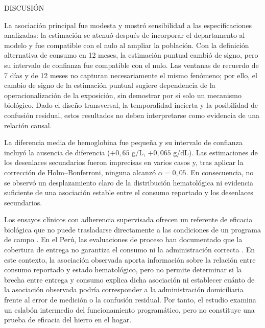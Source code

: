 \documentclass[man,11pt,donotrepeattitle,floatsintext]{apa7}
\makeatletter
\renewcommand{\section}{\@startsection {section}{1}{\z@}%
    {\b@level@one@skip}{\e@level@one@skip}%
    {\normalfont\large\bfseries\raggedright}}
\makeatother
\begin{document}
\section{DISCUSIÓN}

La asociación principal fue modesta y mostró sensibilidad a las especificaciones analizadas: la estimación se atenuó después de incorporar el departamento al modelo y fue compatible con el nulo al ampliar la población. Con la definición alternativa de consumo en 12 meses, la estimación puntual cambió de signo, pero su intervalo de confianza fue compatible con el nulo. Las ventanas de recuerdo de 7 días y de 12 meses no capturan necesariamente el mismo fenómeno; por ello, el cambio de signo de la estimación puntual sugiere dependencia de la operacionalización de la exposición, sin demostrar por sí solo un mecanismo biológico. Dado el diseño transversal, la temporalidad incierta y la posibilidad de confusión residual, estos resultados no deben interpretarse como evidencia de una relación causal.


La diferencia media de hemoglobina fue pequeña y su intervalo de confianza incluyó la ausencia de diferencia ($+0{,}65$ g/L, $+0{,}065$ g/dL). Las estimaciones de los desenlaces secundarios fueron imprecisas en varios casos y, tras aplicar la corrección de Holm--Bonferroni, ninguna alcanzó $\alpha{=}0{,}05$. En consecuencia, no se observó un desplazamiento claro de la distribución hematológica ni evidencia suficiente de una asociación estable entre el consumo reportado y los desenlaces secundarios.



Los ensayos clínicos con adherencia supervisada ofrecen un referente de eficacia biológica que no puede trasladarse directamente a las condiciones de un programa de campo \parencite{low2013,who2016iron,neuberger2016}. En el Perú, las evaluaciones de proceso han documentado que la cobertura de entrega no garantiza el consumo ni la administración correcta \parencite{munares2018,minsa2022}. En este contexto, la asociación observada aporta información sobre la relación entre consumo reportado y estado hematológico, pero no permite determinar si la brecha entre entrega y consumo explica dicha asociación ni establecer cuánto de la asociación observada podría corresponder a la administración domiciliaria frente al error de medición o la confusión residual. Por tanto, el estudio examina un eslabón intermedio del funcionamiento programático, pero no constituye una prueba de eficacia del hierro en el hogar.
\end{document}
